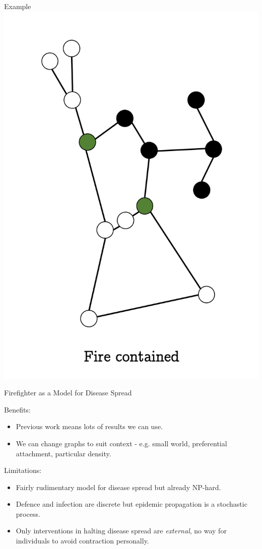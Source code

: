 \documentclass[unknownkeysallowed]{beamer}
\begin{document}
\begin{frame}{Example}
\centering\includegraphics[height=0.8\textheight]{assets/eg-fire/6}
\end{frame}


\begin{frame}{Firefighter as a Model for Disease Spread}

Benefits:
\begin{itemize}
	\pause
	\item Previous work means lots of results we can use.
	\pause
	\item We can change graphs to suit context - e.g. small world, preferential attachment, particular density.
\end{itemize}
\pause
Limitations:
\begin{itemize}
	\pause
	\item Fairly rudimentary model for disease spread but already NP-hard.
	\pause
	\item Defence and infection are discrete but epidemic propagation is a stochastic process.
	\pause
	\item Only interventions in halting disease spread are {\it external}, no way for individuals to avoid contraction personally.
\end{itemize}
	
\end{frame}
\end{document}
